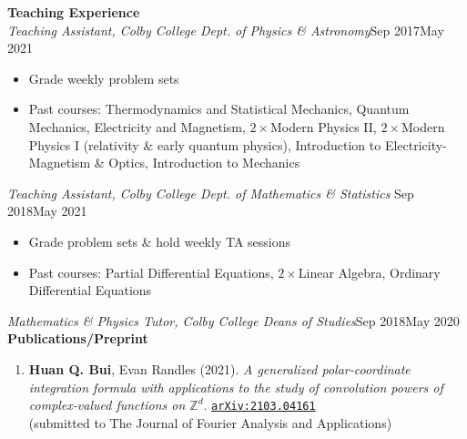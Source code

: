 \documentclass[10pt]{article}
\begin{document}
\noindent \large{{\textbf{Teaching Experience}}} \normalsize \\ 
\noindent \textit{Teaching Assistant, Colby College Dept. of Physics \& Astronomy}\hfill Sep 2017\textendash May 2021 \vspace{-5pt}
\begin{itemize}
	\setlength\itemsep{-4pt}
	\item Grade weekly problem sets 
	\item Past courses:  Thermodynamics and Statistical Mechanics, Quantum Mechanics, Electricity and Magnetism, $2\times$Modern Physics II, $2\times$Modern Physics I (relativity \& early quantum physics), Introduction to Electricity-Magnetism \& Optics, Introduction to Mechanics 
\end{itemize}


\noindent \textit{Teaching Assistant, Colby College Dept. of Mathematics \& Statistics} \hfill Sep 2018\textendash May 2021 \vspace{-5pt}
\begin{itemize}
	\setlength\itemsep{-4pt}
	\item Grade problem sets \& hold weekly TA sessions
	\item Past courses: Partial Differential Equations, $2\times$Linear Algebra, Ordinary Differential Equations
\end{itemize}


\noindent \textit{Mathematics \& Physics Tutor, Colby College Deans of Studies}\hfill  Sep 2018\textendash May 2020\\




\noindent \large{\textbf{{Publications/Preprint}}}	\normalsize	\vspace{-5pt}
\begin{enumerate}
	\setlength\itemsep{-4pt}
	\item \textbf{Huan Q. Bui}, Evan Randles (2021). \textit{A generalized polar-coordinate integration formula with applications to the study of convolution powers of complex-valued functions on $\mathbb{Z}^d$}. \href{https://arxiv.org/abs/2103.04161}{\texttt{arXiv:2103.04161}} \\
	(submitted to The Journal of Fourier Analysis and Applications)
\end{enumerate}
				
\end{document}
